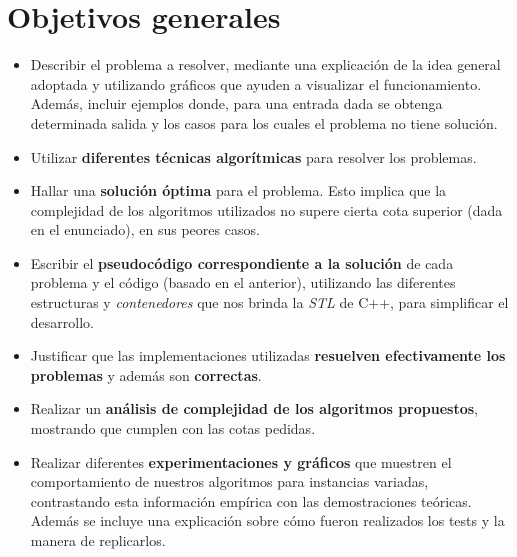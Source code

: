 \documentclass[a4paper]{article}
\begin{document}
\section{Objetivos generales}
\begin{itemize}
  \item Describir el problema a resolver, mediante una explicación de la idea general adoptada y
  utilizando gráficos que ayuden a visualizar el funcionamiento. Además, incluir ejemplos donde,
  para una entrada dada se obtenga determinada salida y los casos para los cuales el problema no
  tiene solución.

  \item Utilizar \textbf{diferentes técnicas algorítmicas} para resolver los problemas.

  \item Hallar una \textbf{solución óptima} para el problema. Esto implica que la complejidad de los
  algoritmos utilizados no supere cierta cota superior (dada en el enunciado), en sus peores casos.

  \item Escribir el \textbf{pseudocódigo correspondiente a la solución} de cada problema y el código
  (basado en el anterior), utilizando las diferentes estructuras y \textit{contenedores} que nos
  brinda la \textit{STL} de C++, para simplificar el desarrollo.

  \item Justificar que las implementaciones utilizadas \textbf{resuelven efectivamente los problemas} y
  además son \textbf{correctas}.

  \item Realizar un \textbf{análisis de complejidad de los algoritmos propuestos}, mostrando que cumplen
  con las cotas pedidas.

  \item Realizar diferentes \textbf{experimentaciones y gráficos} que muestren el comportamiento de nuestros
  algoritmos para instancias variadas, contrastando esta información empírica con las demostraciones
  teóricas. Además se incluye una explicación sobre cómo fueron realizados los tests y la manera de replicarlos.
\end{itemize}


\newpage
\end{document}
